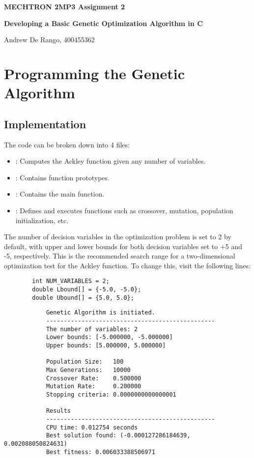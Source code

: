 \documentclass[12pt]{article}
\begin{document}
	
	\justifying
	
	\begin{center}
		\textbf{{\large MECHTRON 2MP3 Assignment 2}}
		
		\textbf{Developing a Basic Genetic Optimization Algorithm in C} 
		
		Andrew De Rango, 400455362
	\end{center}
	
		
	
	
	\section{Programming the Genetic Algorithm}

	\subsection{Implementation}
	
	The code can be broken down into 4 files:
	
	\begin{itemize}
		\item {}: Computes the Ackley function given any number of variables.
		\item {}: Contains function prototypes.
		\item {}: Contains the main function.
		\item {}: Defines and executes functions such as crossover, mutation, population initialization, etc.
	\end{itemize}
	
	The number of decision variables in the optimization problem is set to 2 by default, with upper and lower bounds for both decision variables set to +5 and -5, respectively. This is the recommended search range for a two-dimensional optimization test for the Ackley function. To change this, visit the following lines:
	
	\begin{lstlisting}
		int NUM_VARIABLES = 2;
		double Lbound[] = {-5.0, -5.0};
		double Ubound[] = {5.0, 5.0};
	\end{lstlisting}
	
	\begin{mdframed}[style=myboxstyleTerminal1]
		\begin{verbatim}
			Genetic Algorithm is initiated.
			------------------------------------------------
			The number of variables: 2
			Lower bounds: [-5.000000, -5.000000]
			Upper bounds: [5.000000, 5.000000]
			
			Population Size:   100
			Max Generations:   10000
			Crossover Rate:    0.500000
			Mutation Rate:     0.200000
			Stopping criteria: 0.0000000000000001
			
			Results
			------------------------------------------------
			CPU time: 0.012754 seconds
			Best solution found: (-0.000127286184639, 0.002088050824631)
			Best fitness: 0.006033388506971
		\end{verbatim}
	\end{mdframed}
	
\end{document}
